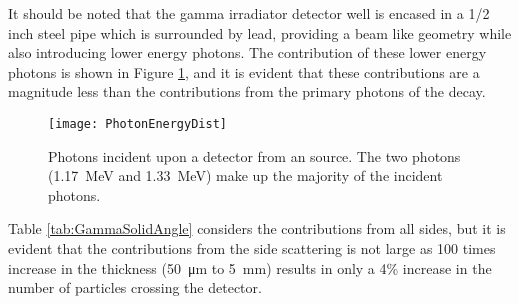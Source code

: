 It should be noted that the gamma irradiator detector well is encased in a 1/2 inch steel pipe which is surrounded by lead, providing a beam like geometry while also introducing lower energy photons. 
The contribution of these lower energy photons is shown in Figure \ref{fig:PhotonFluxAllEnergies}, and it is evident that these contributions are a magnitude less than the contributions from the primary photons of the  decay.
\begin{figure}
  \texttt{[image: PhotonEnergyDist]}
	\caption[Photons Incident upon Detector]{Photons incident upon a detector from an  source.  The two  photons (\SI{1.17}{\MeV} and \SI{1.33}{\MeV}) make up the majority of the incident photons.}
  \label{fig:PhotonFluxAllEnergies}
\end{figure}
Table \ref{tab:GammaSolidAngle} considers the contributions from all sides, but it is evident that the contributions from the side scattering is not large as 100 times increase in the thickness (\SI{50}{\um} to \SI{5}{\mm}) results in only a 4\% increase in the number of particles crossing the detector.

